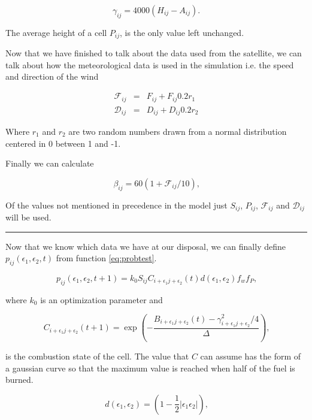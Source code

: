 \documentclass[Lau]{sapthesis} %
\newcommand{\e}{\epsilon}
\newlength{\rulewidth}\setlength{\rulewidth}{0.4pt}
\newcommand{\myrule}{\noindent\rule{\textwidth}{\rulewidth}}
\begin{document}
\begin{equation} %
\gamma_{ij} = 4000(H_{ij}-A_{ij})\textrm{.}
\end{equation}

The average height of a cell $P_{ij}$, is the only value left unchanged.

Now that we have finished to talk about the data used from the satellite, we can
talk about how the meteorological data is used in the simulation i.e. the speed
and direction of the wind

\begin{eqnarray}
\mathcal{F}_{ij} &=& F_{ij} + F_{ij}0.2r_1\\
\mathcal{D}_{ij} &=& D_{ij} + D_{ij}0.2r_2
\end{eqnarray}

Where $r_1$ and $r_2$ are two random numbers drawn from a normal distribution
centered in 0 between 1 and -1.

Finally we can calculate

\begin{equation}
\beta_{ij} = 60(1+\mathcal{F}_{ij}/10)\textrm{,}
\end{equation}

Of the values not mentioned in precedence in the model just $S_{ij}$, $P_{ij}$,
$\mathcal{F}_{ij}$ and $\mathcal{D}_{ij}$ will be used.

\myrule

Now that we know which data we have at our disposal, we can finally define
$p_{ij}(\e_1, \e_2, t)$ from function \ref{eq:probtest}.

\begin{equation}\label{eq:prob}
p_{ij}(\e_1, \e_2, t+1) = k_0 S_{ij} C_{i+\e_1j+\e_2}(t) d(\e_1, \e_2) f_w f_P\textrm{,}
\end{equation}

where $k_0$ is an optimization parameter and

\begin{equation}\label{eq:combust}
C_{i+\e_1j+\e_2}(t+1) = \exp\left(-\frac{B_{i+\e_1j+\e_2}(t) - \gamma_{i+\e_1j+\e_2}^2/4}{\Delta}\right)\textrm{,}
\end{equation}

is the combustion state of the cell. The  value that $C$ can assume has the form
of a gaussian curve so that the maximum value is reached when half of the fuel
is burned.

\begin{equation}\label{eq:disom}
d(\e_1, \e_2) = \left(1-\frac{1}{2}|\e_1\e_2|\right)\textrm{,}
\end{equation}
\end{document}
